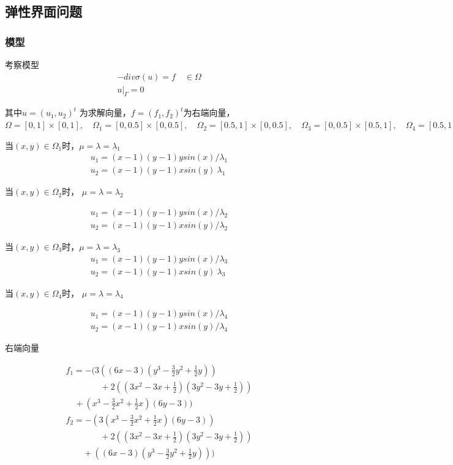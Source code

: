 \documentclass[a4paper,UTF8,titlepage]{ctexart}
\begin{document}
\subsection{弹性界面问题}

\subsubsection{模型}

考察模型
$$
\begin{matrix}
	-div \sigma(u) = f \quad \in \Omega  \\
	u |_{\Gamma} = 0
\end{matrix}
$$ 
\par
其中$ u = (u_1,u_2)^t $ 为求解向量，$ f = (f_1,f_2)^t $为右端向量，
$ 
\Omega = [0,1] \times [0,1] , \quad 
\Omega_1 = [0,0.5] \times [0,0.5] , \quad
\Omega_2 = [0.5,1] \times [0,0.5], \quad
\Omega_3 = [0,0.5] \times [0.5,1], \quad
\Omega_4 = [0.5,1] \times [0.5,1]
$ 
\par
当$(x,y) \in \Omega_1$时，$\mu = \lambda = \lambda_1$
$$
\begin{matrix}
	u_1 = (x - 1)(y - 1) y sin(x) / \lambda_1
	\\
	u_2 = (x - 1)(y - 1) x sin(y) \ \lambda_1
\end{matrix}
$$

当$(x,y) \in \Omega_2$时， $\mu = \lambda = \lambda_2$

$$
\begin{matrix}
	u_1 = (x - 1)(y - 1) y sin(x) / \lambda_2 
	\\
	u_2 = (x - 1)(y - 1) x sin(y) / \lambda_2
\end{matrix}
$$

当$(x,y) \in \Omega_3$时，$\mu = \lambda = \lambda_3$
$$
\begin{matrix}
	u_1 = (x - 1)(y - 1) y sin(x) / \lambda_3
	\\
	u_2 = (x - 1)(y - 1) x sin(y) \ \lambda_3
\end{matrix}
$$

当$(x,y) \in \Omega_4$时， $\mu = \lambda = \lambda_4$

$$
\begin{matrix}
	u_1 = (x - 1)(y - 1) y sin(x) / \lambda_4 
	\\
	u_2 = (x - 1)(y - 1) x sin(y) / \lambda_4
\end{matrix}
$$

右端向量

$$
\begin{matrix}
	f_1 = -(3((6x-3) (y^3-\frac{3}{2}y^2+\frac{1}{2}y)) \\
	\quad \quad \quad \quad+ 2((3x^2-3x+\frac{1}{2}) (3y^2-3y+\frac{1}{2})) \\
	\quad + (x^3-\frac{3}{2}x^2+\frac{1}{2}x) (6y-3))
\end{matrix}
$$
$$
\begin{matrix}
	f_2 = -(3(x^3-\frac{3}{2}x^2+\frac{1}{2}x) (6y-3)) \\
	\quad \quad \quad \quad+2((3x^2-3x+\frac{1}{2}) (3y^2-3y+\frac{1}{2})) \\
	\quad \quad + ((6x-3) (y^3-\frac{3}{2}y^2+\frac{1}{2}y)))
\end{matrix}
$$
\end{document}
